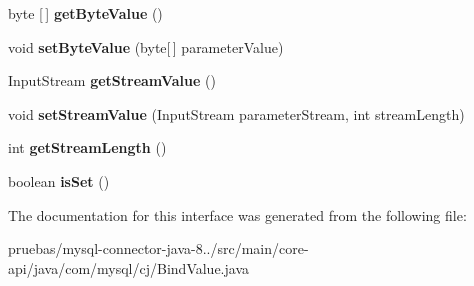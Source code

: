 \begin{DoxyCompactItemize}
byte \mbox{[}$\,$\mbox{]} {\bfseries get\+Byte\+Value} ()
\item 
\mbox{\label{interfacecom_1_1mysql_1_1cj_1_1_bind_value_ab8c1dc59e4f139d0004481cb608a41aa}} 
void {\bfseries set\+Byte\+Value} (byte\mbox{[}$\,$\mbox{]} parameter\+Value)
\item 
\mbox{\label{interfacecom_1_1mysql_1_1cj_1_1_bind_value_aee74c54d4ba871b7e63cf8a76d3f04fd}} 
Input\+Stream {\bfseries get\+Stream\+Value} ()
\item 
\mbox{\label{interfacecom_1_1mysql_1_1cj_1_1_bind_value_aae317c620c8bbcaca76be87eacaa5533}} 
void {\bfseries set\+Stream\+Value} (Input\+Stream parameter\+Stream, int stream\+Length)
\item 
\mbox{\label{interfacecom_1_1mysql_1_1cj_1_1_bind_value_a4388253fc77d9f51682b5c67a6869d8e}} 
int {\bfseries get\+Stream\+Length} ()
\item 
\mbox{\label{interfacecom_1_1mysql_1_1cj_1_1_bind_value_a559abc1794dd2783db255ab3b341fa70}} 
boolean {\bfseries is\+Set} ()
\end{DoxyCompactItemize}


The documentation for this interface was generated from the following file\+:\begin{DoxyCompactItemize}
\item 
pruebas/mysql-\/connector-\/java-\/8../src/main/core-\/api/java/com/mysql/cj/Bind\+Value.\+java\end{DoxyCompactItemize}
